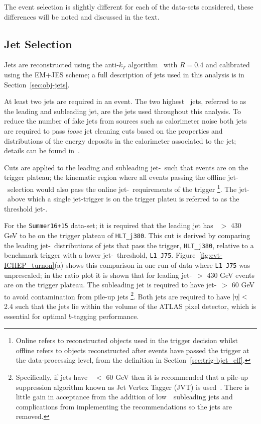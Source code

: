 The event selection is slightly different for each of the data-sets considered,
these differences will be noted and discussed in the text.

\subsection{Jet Selection}
\label{sec:evt-sel-jets}

Jets are reconstructed using the anti-$k_T$ algorithm~\cite{obj-jets_reco_akt} with $R=0.4$
and calibrated using the EM+JES scheme;
a full description of jets used in this analysis is in Section~\ref{sec:obj-jets}.

At least two jets are required in an event.
The two highest \pT~jets, referred to as the leading and subleading jet,
are the jets used throughout this analysis.
To reduce the number of fake jets from sources such as calorimeter noise
both jets are required to pass \textit{loose} jet cleaning cuts
based on the properties and distributions of the energy deposits in the calorimeter associated to the jet;
details can be found in~\cite{evt-jet_cleaning}.

Cuts are applied to the leading and subleading jet-\pT~such that events are on the trigger plateau;
the kinematic region where all events passing the offline jet-\pT~selection
would also pass the online jet-\pT~requirements of the trigger
\footnote{Online refers to reconstructed objects used in the trigger decision
  whilst offline refers to objects reconstructed after events have passed the trigger at the data-processing level,
  from the definition in Section~\ref{sec:trig-bjet_eff}.}.
The jet-\pT~above which a single jet-trigger is on the trigger plateu is referred to as the threshold jet-\pT.

For the \verb|Summer16+15| data-set; it is required that the leading jet has \pT~$>$ 430 GeV to be on the trigger plateau of \verb|HLT_j380|.
This cut is derived by comparing the leading jet-\pT~distributions of jets that pass the trigger, \verb|HLT_j380|,
relative to a benchmark trigger with a lower jet-\pT~threshold, \verb|L1_J75|.
Figure~\ref{fig:evt-ICHEP_turnon}(a) shows this comparison in one run of data where \verb|L1_J75| was unprescaled;
in the ratio plot it is shown that for leading jet-\pT~$>$ 430 GeV events are on the trigger plateau.
The subleading jet is required to have jet-\pT~$>$ 60 GeV
to avoid contamination from pile-up jets
\footnote{Specifically, if jets have~\pT~$<$ 60 GeV then it is recommended that
  a pile-up suppression algorithm known as Jet Vertex Tagger (JVT) is used~\cite{evt-jvt}.
  There is little gain in acceptance from the addition of low~\pT~subleading jets and
  complications from implementing the recommendations so the jets are removed. }.
Both jets  are required to have $|\eta| <$ 2.4
such that the jets lie within the volume of the ATLAS pixel detector,
which is essential for optimal $b$-tagging performance.

